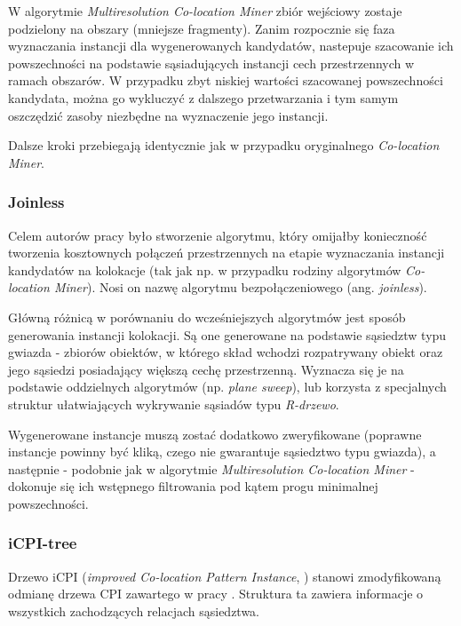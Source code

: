 \documentclass[12pt]{article}
\begin{document}
W algorytmie \textit{Multiresolution Co-location Miner} zbiór wejściowy zostaje podzielony na obszary (mniejsze fragmenty). Zanim rozpocznie się faza wyznaczania instancji dla wygenerowanych kandydatów, nastepuje szacowanie ich powszechności na podstawie sąsiadujących instancji cech przestrzennych w ramach obszarów. W przypadku zbyt niskiej wartości szacowanej powszechności kandydata, można go wykluczyć z dalszego przetwarzania i tym samym oszczędzić zasoby niezbędne na wyznaczenie jego instancji.

Dalsze kroki przebiegają identycznie jak w przypadku oryginalnego \textit{Co-location Miner}.

\subsubsection{Joinless}

Celem autorów pracy \cite{joinless} było stworzenie algorytmu, który omijałby konieczność tworzenia kosztownych połączeń przestrzennych na etapie wyznaczania instancji kandydatów na kolokacje (tak jak np. w przypadku rodziny algorytmów \textit{Co-location Miner}). Nosi on nazwę algorytmu bezpołączeniowego (ang. \textit{joinless}).

Główną różnicą w porównaniu do wcześniejszych algorytmów jest sposób generowania instancji kolokacji. Są one generowane na podstawie sąsiedztw typu gwiazda - zbiorów obiektów, w którego skład wchodzi rozpatrywany obiekt oraz jego sąsiedzi posiadający większą cechę przestrzenną. Wyznacza się je na podstawie oddzielnych algorytmów (np. \textit{plane sweep}), lub korzysta z specjalnych struktur ułatwiających wykrywanie sąsiadów typu \textit{R-drzewo}.

Wygenerowane instancje muszą zostać dodatkowo zweryfikowane (poprawne instancje powinny być kliką, czego nie gwarantuje sąsiedztwo typu gwiazda), a następnie - podobnie jak w algorytmie \textit{Multiresolution Co-location Miner} - dokonuje się ich wstępnego filtrowania pod kątem progu minimalnej powszechności.

\subsubsection{iCPI-tree}

Drzewo iCPI (\textit{improved Co-location Pattern Instance}, \cite{icpi}) stanowi zmodyfikowaną odmianę drzewa CPI zawartego w pracy \cite{cpi}. Struktura ta zawiera informacje o wszystkich zachodzących relacjach sąsiedztwa. 
\end{document}

